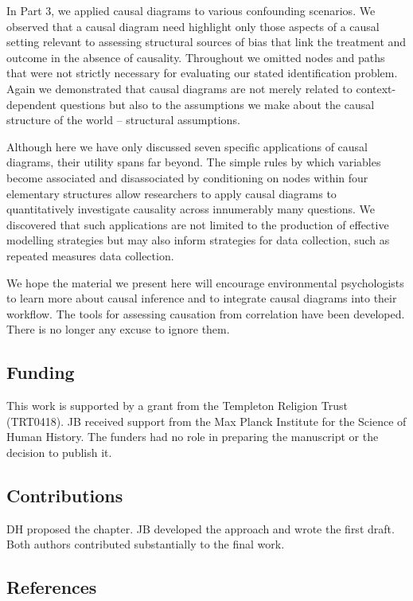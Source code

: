\documentclass[
  singlecolumn]{article}
\begin{document}
In Part 3, we applied causal diagrams to various confounding scenarios.
We observed that a causal diagram need highlight only those aspects of a
causal setting relevant to assessing structural sources of bias that
link the treatment and outcome in the absence of causality. Throughout
we omitted nodes and paths that were not strictly necessary for
evaluating our stated identification problem. Again we demonstrated that
causal diagrams are not merely related to context-dependent questions
but also to the assumptions we make about the causal structure of the
world -- structural assumptions.

Although here we have only discussed seven specific applications of
causal diagrams, their utility spans far beyond. The simple rules by
which variables become associated and disassociated by conditioning on
nodes within four elementary structures allow researchers to apply
causal diagrams to quantitatively investigate causality across
innumerably many questions. We discovered that such applications are not
limited to the production of effective modelling strategies but may also
inform strategies for data collection, such as repeated measures data
collection.

We hope the material we present here will encourage environmental
psychologists to learn more about causal inference and to integrate
causal diagrams into their workflow. The tools for assessing causation
from correlation have been developed. There is no longer any excuse to
ignore them.

\newpage{}

\subsection{Funding}\label{funding}

This work is supported by a grant from the Templeton Religion Trust
(TRT0418). JB received support from the Max Planck Institute for the
Science of Human History. The funders had no role in preparing the
manuscript or the decision to publish it.

\subsection{Contributions}\label{contributions}

DH proposed the chapter. JB developed the approach and wrote the first
draft. Both authors contributed substantially to the final work.

\subsection{References}\label{references}
\end{document}
